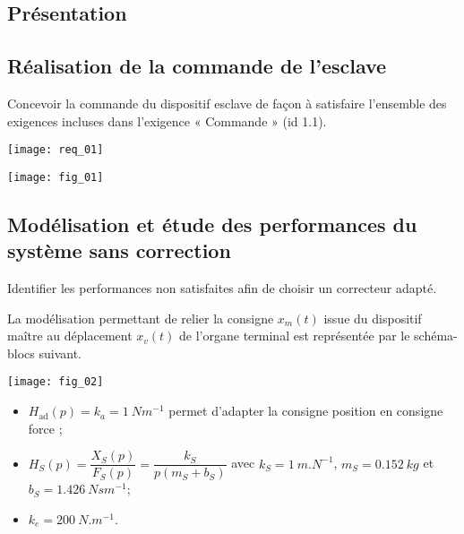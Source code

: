 \setcounter{exo}{0}
\begin{multicols}{2}


\subsection*{Présentation}


\subsection*{Réalisation de la commande de l’esclave}
\begin{obj}
Concevoir la commande du dispositif esclave de façon à satisfaire l’ensemble des
exigences incluses dans l’exigence « Commande » (id 1.1).
\end{obj}

\begin{center}
\texttt{[image: req\_01]}
\end{center}

\begin{center}
\texttt{[image: fig\_01]}
\end{center}


\subsection*{Modélisation et étude des performances du système sans correction}
\begin{obj}
Identifier les performances non satisfaites afin de choisir un correcteur adapté.
\end{obj}

La modélisation permettant de relier la consigne $x_m(t)$ issue du dispositif maître au déplacement
$x_v(t)$ de l’organe terminal est représentée par le schéma-blocs suivant.

\begin{center}
\texttt{[image: fig\_02]}
\end{center}

\begin{itemize}
\item $H_{\text{ad}}(p) = k_a = \SI{1}{Nm^{-1}}$ permet d’adapter la consigne position en consigne force ;
\item $H_S(p) = \dfrac{X_S(p)}{F_S(p)}=\dfrac{k_S}{p\left( m_S +b_S\right)}$ avec $k_S = \SI{1}{m.N^{-1}}$, $m_S = \SI{0,152}{kg}$ et $b_S = \SI{1,426}{Nsm^{-1}}$;
\item $k_e = \SI{200}{N.m^{-1}}$.
\end{itemize}



\end{multicols}
